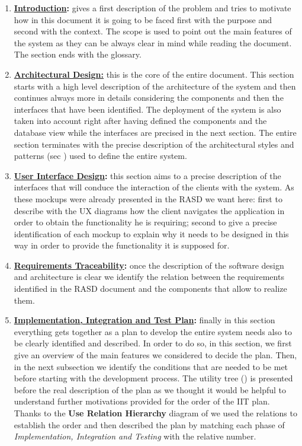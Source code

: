 		\begin{enumerate}
			\item \textbf{\hyperref[sec:introduction]{Introduction}:} gives a first description of the problem and tries to motivate how in this document it is going to be faced first with the purpose and second with the context. The scope is used to point out the main features of the system as they can be always clear in mind while reading the document. The section ends with the glossary.
		
			\item \textbf{\hyperref[sec:architecturalDesign]{Architectural Design:}} this is the core of the entire document. This section starts with a high level description of the architecture of the system and then continues always more in details considering the components and then the interfaces that have been identified. The deployment of the system is also taken into account right after having defined the components and the database view while the interfaces are precised in the next section. The entire section terminates with the precise description of the architectural styles and patterns (sec ) used to define the entire system.
			
			\item \textbf{\hyperref[sec:userInterfaceDesign]{User Interface Design}:} this section aims to a precise description of the interfaces that will conduce the interaction of the clients with the system. As these mockups were already presented in the RASD we want here: first to describe with the UX diagrams how the client navigates the application in order to obtain the functionality he is requiring; second to give a precise identification of each mockup to explain why it needs to be designed in this way in order to provide the functionality it is supposed for.
			
			\item \textbf{\hyperref[sec:requirementsTraceability]{Requirements Traceability}:} once the description of the software design and architecture is clear we identify the relation between the requirements identified in the RASD document \cite{RASD} and the components that allow to realize them.
			
			\item \textbf{\hyperref[sec:iitPlan]{Implementation, Integration and Test Plan}:} finally in this section everything gets together as a plan to develop the entire system needs also to be clearly identified and described. In order to do so, in this section, we first give an overview of the main features we considered to decide the plan. Then, in the next subsection we identify the conditions that are needed to be met before starting with the development process. The utility tree () is presented before the real description of the plan as we thought it would be helpful to understand further motivations provided for the order of the IIT plan. Thanks to the \textbf{Use Relation Hierarchy} diagram of  we used the relations to establish the order and then described the plan by matching each phase of \emph{Implementation, Integration and Testing} with the relative number.
			

\end{enumerate}
